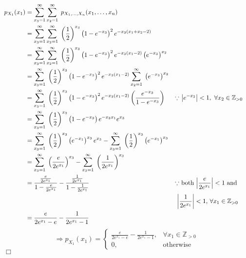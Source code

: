\documentclass{mthe353answer}
\begin{document}
\begin{questions}
  \question{}
  \begin{align*}
    p_{X_1}(x_1) &= \sum_{x_3 = 1}^{\infty}\sum_{x_2 = 1}^{\infty}\; p_{X_1,\ldots,X_n}(x_1,\ldots,x_n)\\
    &= \sum_{x_3 = 1}^{\infty} \sum_{x_2 = 1}^{\infty}\; \left(\frac{1}{2}\right)^{x_3} \left(1-e^{-x_3}\right)^2 e^{-x_3(x_1+x_2-2)}\\
    &= \sum_{x_3 = 1}^{\infty} \sum_{x_2 = 1}^{\infty}\; \left(\frac{1}{2}\right)^{x_3} \left(1-e^{-x_3}\right)^2 e^{-x_3(x_1-2)} \left(e^{-x_3}\right)^{x_2}\\
    &= \sum_{x_3 = 1}^{\infty}\; \left(\frac{1}{2}\right)^{x_3} \left(1-e^{-x_3}\right)^2 e^{-x_3(x_1-2)} \sum_{x_2 = 1}^{\infty}\; \left(e^{-x_3}\right)^{x_2}\\
    &= \sum_{x_3 = 1}^{\infty}\; \left(\frac{1}{2}\right)^{x_3} \left(1-e^{-x_3}\right)^2 e^{-x_3(x_1-2)} \left(\frac{e^{-x_3}}{1-e^{-x_3}}\right)
      && \text{\(\because\) \( \left\lvert e^{-x_2} \right\rvert < 1,\ \forall x_2 \in \mathbb{Z}_{>0} \)}\\
    &= \sum_{x_3 = 1}^{\infty}\; \left(\frac{1}{2}\right)^{x_3} \left(1-e^{-x_3}\right) e^{-x_3x_1} e^{x_3}\\
    &= \sum_{x_3 = 1}^{\infty}\; \left(\frac{1}{2}\right)^{x_3} \left(e^{-x_1}\right)^{x_3} e^{x_3} - \sum_{x_3 = 1}^{\infty}\; \left(\frac{1}{2}\right)^{x_3} \left(e^{-x_1}\right)^{x_3}\\
    &= \sum_{x_3 = 1}^{\infty}\; \left(\frac{e}{2e^{x_1}}\right)^{x_3} - \sum_{x_3 = 1}^{\infty}\; \left(\frac{1}{2e^{x_1}}\right)^{x_3}\\
    &= \frac{\frac{e}{2e^{x_1}}}{1 - \frac{e}{2e^{x_1}}} - \frac{\frac{1}{2e^{x_1}}}{1 - \frac{1}{2e^{x_1}}}
      && \text{\(\because\) both \( \left\lvert \frac{e}{2e^{x_1}} \right\rvert < 1 \) and }\\
    & && \text{ \( \left\lvert \frac{1}{2e^{x_1}} \right\rvert < 1 \), \( \forall x_1 \in \mathbb{Z}_{>0} \) }\\
    &= \frac{e}{2e^{x_1} - e} - \frac{1}{2e^{x_1} - 1}
  \end{align*}
  \begin{displaymath}
    \Rightarrow 
    \boxed{
      p_{X_1}(x_1) = 
      \begin{cases}
        \frac{e}{2e^{x_1} - e} - \frac{1}{2e^{x_1} - 1}, & \forall x_1 \in \mathbb{Z}_{>0}\\
        0, & \text{otherwise}
      \end{cases}
    }
  \end{displaymath}
  \hfill \(\Box\)
\end{questions}
\end{document}
